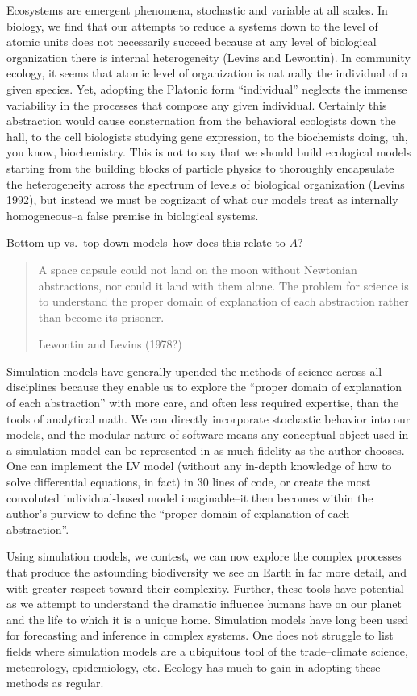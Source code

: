 Ecosystems are emergent phenomena, stochastic and variable at all
scales. In biology, we find that our attempts to reduce a systems down
to the level of atomic units does not necessarily succeed because at any
level of biological organization there is internal heterogeneity (Levins
and Lewontin). In community ecology, it seems that atomic level of
organization is naturally the individual of a given species. Yet,
adopting the Platonic form ``individual'' neglects the immense
variability in the processes that compose any given individual.
Certainly this abstraction would cause consternation from the behavioral
ecologists down the hall, to the cell biologists studying gene
expression, to the biochemists doing, uh, you know, biochemistry. This
is not to say that we should build ecological models starting from the
building blocks of particle physics to thoroughly encapsulate the
heterogeneity across the spectrum of levels of biological organization
(Levins 1992), but instead we must be cognizant of what our models treat
as internally homogeneous--a false premise in biological systems.

Bottom up vs.~top-down models--how does this relate to \(A\)?

\begin{quote}
A space capsule could not land on the moon without Newtonian
abstractions, nor could it land with them alone. The problem for science
is to understand the proper domain of explanation of each abstraction
rather than become its prisoner.

Lewontin and Levins (1978?)
\end{quote}

Simulation models have generally upended the methods of science across
all disciplines because they enable us to explore the ``proper domain of
explanation of each abstraction'' with more care, and often less
required expertise, than the tools of analytical math. We can directly
incorporate stochastic behavior into our models, and the modular nature
of software means any conceptual object used in a simulation model can
be represented in as much fidelity as the author chooses. One can
implement the LV model (without any in-depth knowledge of how to solve
differential equations, in fact) in 30 lines of code, or create the most
convoluted individual-based model imaginable--it then becomes within the
author's purview to define the ``proper domain of explanation of each
abstraction''.

Using simulation models, we contest, we can now explore the complex
processes that produce the astounding biodiversity we see on Earth in
far more detail, and with greater respect toward their complexity.
Further, these tools have potential as we attempt to understand the
dramatic influence humans have on our planet and the life to which it is
a unique home. Simulation models have long been used for forecasting and
inference in complex systems. One does not struggle to list fields where
simulation models are a ubiquitous tool of the trade--climate science,
meteorology, epidemiology, etc. Ecology has much to gain in adopting
these methods as regular.

